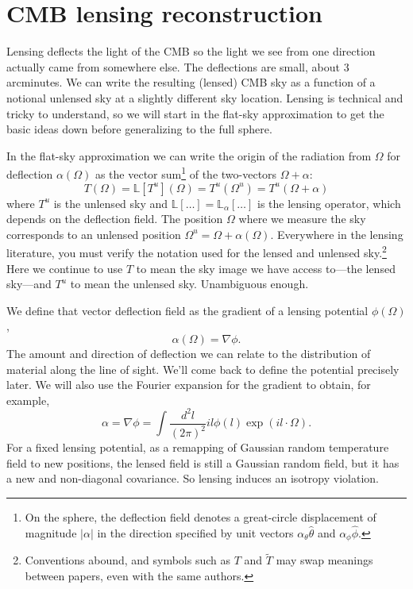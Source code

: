 \chapter{CMB lensing reconstruction} \label{ch:CMB_lensing}

Lensing deflects the light of the CMB so the light we see from one direction actually came from somewhere else.  The deflections are small, about 3 arcminutes.  We can write the resulting (lensed) CMB sky as a function of a notional unlensed sky at a slightly different sky location.  Lensing is technical and tricky to understand, so we will start in the flat-sky approximation to get the basic ideas down before generalizing to the full sphere.

In the flat-sky approximation we can write the origin of the radiation from $\Omega$  for deflection $\alpha(\Omega)$ as the vector sum\footnote{On the sphere, the deflection field denotes a great-circle displacement of magnitude $|\alpha|$ in the direction specified by unit vectors $\alpha_\theta \hat \theta$ and $\alpha_\phi \hat \phi$.} of the two-vectors $\Omega + \alpha$:
\begin{equation}
  T(\Omega) = \mathbb{L}[T^u](\Omega) = T^u(\Omega^u)= T^u(\Omega + \alpha)
\end{equation} 
where $T^u$ is the unlensed sky and $\mathbb{L}[\dots] = \mathbb{L}_\alpha[\dots]$ is the lensing operator, which depends on the deflection field.  The position $\Omega$ where we measure the sky corresponds to an unlensed position $\Omega^u = \Omega + \alpha(\Omega)$.
Everywhere in the lensing literature, you must verify the notation used for the lensed and unlensed sky.\footnote{Conventions abound, and symbols such as $T$ and $\tilde T$ may swap meanings between papers, even with the same authors.}  Here we continue to use $T$ to mean the sky image we have access to---the lensed sky---and $T^u$ to mean the unlensed sky.  Unambiguous enough.

We define that vector deflection field as the gradient of a lensing potential $\phi(\Omega)$,
\begin{equation}
\alpha(\Omega) = \nabla \phi.
\end{equation}
The amount and direction of deflection we can relate to the distribution of material along the line of sight.  We'll come back to define the potential precisely later.  We will also use the Fourier expansion for the gradient to obtain, for example,
\begin{equation}
 \alpha = \nabla \phi = \int \frac{d^2 l}{(2\pi)^2} il \phi(l) \exp(il\cdot\Omega).\label{eq:gradphi_harmonics}
\end{equation}
For a fixed lensing potential, as a remapping of Gaussian random temperature field to new positions, the lensed field is still a Gaussian random field, but it has a new and non-diagonal covariance.  So lensing induces an isotropy violation.


